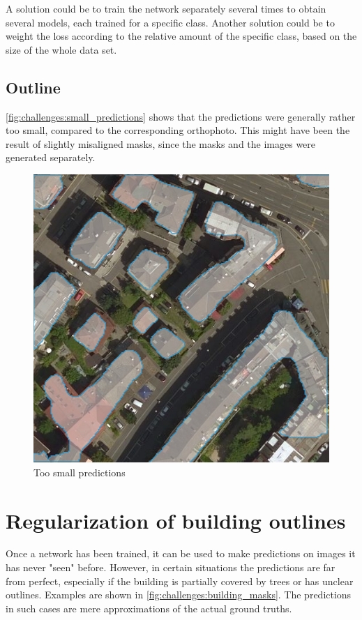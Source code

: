 A solution could be to train the network separately several times to obtain several models, each trained for a specific class. Another solution could be to weight the loss according to the relative amount of the specific class, based on the size of the whole data set.

\subsection{Outline}
\autoref{fig:challenges:small_predictions} shows that the predictions were generally rather too small, compared to the corresponding orthophoto. This might have been the result of slightly misaligned masks, since the masks and the images were generated separately.

\begin{figure}[H]
    \centering
	\includegraphics[width=0.4\linewidth]{chapters/challenges/images/small_predictions.png}
	\caption{Too small predictions}
	\label{fig:challenges:small_predictions}
\end{figure}


\section{Regularization of building outlines}
Once a network has been trained, it can be used to make predictions on images it has never "seen" before. However, in certain situations the predictions are far from perfect, especially if the building is partially covered by trees or has unclear outlines. Examples are shown in \autoref{fig:challenges:building_masks}. The predictions in such cases are mere approximations of the actual ground truths.

